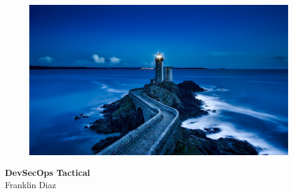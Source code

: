 \begin{titlepage}
    \centering
        \vspace{0mm}
            \begin{figure}[!h]
                \centering
                \includegraphics[scale=0.80]{../images/plouzane-1758197_1920.jpg}
            \end{figure}
        \vspace*{40mm} %
        \begin{flushright}
            \textbf{\Huge {DevSecOps Tactical}}\\
            \vspace{5mm}
            \Large \textsf{Franklin Diaz}\\
            \vspace*{0mm}
        \end{flushright}
	\clearpage
		\vspace*{\fill}
\end{titlepage}

